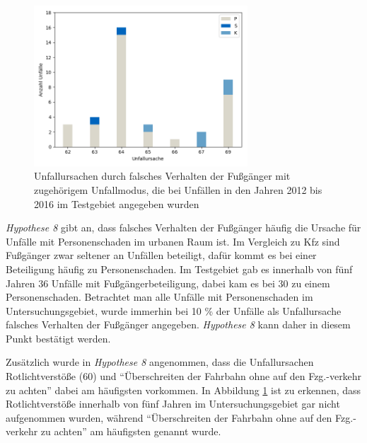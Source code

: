 \begin{savenotes}
	\begin{figure}[H]
		\centering
		\includegraphics[width=8cm,height=6cm]{figures/Urs_Fussgaenger}
		\caption[Unfallursachen durch falsches Verhalten der Fußgänger mit zugehörigem Unfallmodus, die bei Unfällen in den Jahren 2012 bis 2016 im Testgebiet angegeben wurden]{Unfallursachen durch falsches Verhalten der Fußgänger mit zugehörigem Unfallmodus, die bei Unfällen in den Jahren 2012 bis 2016 im Testgebiet angegeben wurden}\label{fig:Fehlverhalten_Fussgaenger}
	\end{figure}
\end{savenotes}

\textit{Hypothese 8} gibt an, dass falsches Verhalten der Fußgänger häufig die Ursache für Unfälle mit Personenschaden im urbanen Raum ist. Im Vergleich zu Kfz sind Fußgänger zwar seltener an Unfällen beteiligt, dafür kommt es bei einer Beteiligung häufig zu Personenschaden. Im Testgebiet gab es innerhalb von fünf Jahren 36 Unfälle mit Fußgängerbeteiligung, dabei kam es bei 30 zu einem Personenschaden. Betrachtet man alle Unfälle mit Personenschaden im Untersuchungsgebiet, wurde immerhin bei 10 \% der Unfälle als Unfallursache falsches Verhalten der Fußgänger angegeben. \textit{Hypothese 8} kann daher in diesem Punkt bestätigt werden.

Zusätzlich wurde in \textit{Hypothese 8} angenommen, dass die Unfallursachen Rotlichtverstöße (60) und \enquote{Überschreiten der Fahrbahn ohne auf den Fzg.-verkehr zu achten} dabei am häufigsten vorkommen. In Abbildung \ref{fig:Fehlverhalten_Fussgaenger} ist zu erkennen, dass Rotlichtverstöße innerhalb von fünf Jahren im Untersuchungsgebiet gar nicht aufgenommen wurden, während \enquote{Überschreiten der Fahrbahn ohne auf den Fzg.-verkehr zu achten} am häufigsten genannt wurde.

